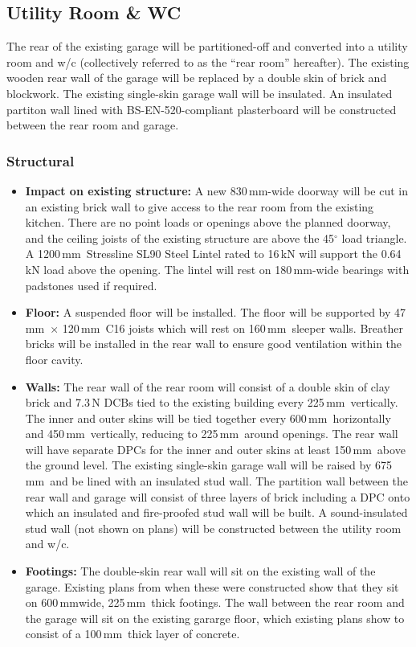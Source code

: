 \documentclass{extension}
\newcommand{\mm}{\,$\mathrm{mm}$}
\begin{document}
\subsection{Utility Room \& WC}
\label{utility}
The rear of the existing garage will be partitioned-off and converted into a utility room and w/c (collectively referred to as the ``rear room'' hereafter). The existing wooden rear wall of the garage will be replaced by a double skin of brick and blockwork. The existing single-skin garage wall will be insulated. An insulated partiton wall lined with BS-EN-520-compliant plasterboard\cite{upboard} will be constructed between the rear room and garage.
\subsubsection{Structural}
\begin{itemize}
  \item {\bf Impact on existing structure:} A new 830\mm -wide doorway will be cut in an existing brick wall to give access to the rear room from the existing kitchen. There are no point loads or openings above the planned doorway, and the ceiling joists of the existing structure are above the 45$^\circ$ load triangle. A 1200\mm\ Stressline SL90 Steel Lintel rated to 16\,kN will support the 0.64\,kN load above the opening. The lintel will rest on 180\mm -wide bearings with padstones used if required.
  \item {\bf Floor:} A suspended floor will be installed. The floor will be supported by 47\mm\ $\times$ 120\mm\ C16 joists which will rest on 160\mm\ sleeper walls. Breather bricks will be installed in the rear wall to ensure good ventilation within the floor cavity.
  \item {\bf Walls:} The rear wall of the rear room will consist of a double skin of clay brick and 7.3\,N DCBs tied to the existing building every 225\mm\ vertically. The inner and outer skins will be tied together every 600\mm\ horizontally and 450\mm\ vertically, reducing to 225\mm\ around openings. The rear wall will have separate DPCs for the inner and outer skins at least 150\mm\ above the ground level. The existing single-skin garage wall will be raised by 675\mm\ and be lined with an insulated stud wall. The partition wall between the rear wall and garage will consist of three layers of brick including a DPC onto which an insulated and fire-proofed stud wall will be built. A sound-insulated stud wall (not shown on plans) will be constructed between the utility room and w/c.
  \item {\bf Footings:} The double-skin rear wall will sit on the existing wall of the garage. Existing plans from when these were constructed show that they sit on 600\mm wide, 225\mm\ thick footings. The wall between the rear room and the garage will sit on the existing gararge floor, which existing plans show to consist of a 100\mm\ thick layer of concrete.

\end{itemize}
\end{document}
